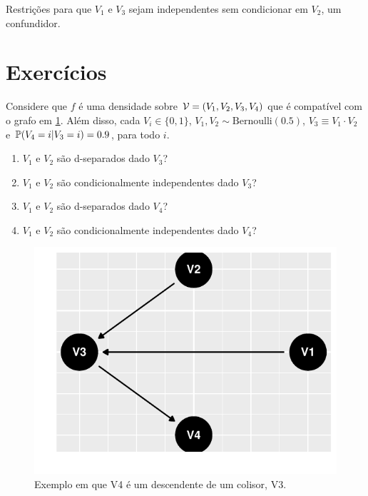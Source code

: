\begin{example}
 Restrições para que $V_1$ e $V_3$ sejam
 independentes sem condicionar em $V_2$, 
 um confundidor.
\end{example}

\section{Exercícios}

\begin{exercise}
 Considere que $f$ é uma densidade sobre 
 $\sV = (V_1, V_2, V_3, V_4)$ que é compatível com
 o grafo em \cref{fig:colisor-desc}.
 Além disso, cada $V_i \in \{0,1\}$,
 $V_1, V_2 \sim \text{Bernoulli}(0.5)$,
 $V_3 \equiv V_1 \cdot V_2$ e
 $\P(V_4 = i | V_3 = i) = 0.9$, para todo $i$.
 \begin{enumerate}[label=(\alph*)]
  \item $V_1$ e $V_2$ são d-separados dado $V_3$?
  \item $V_1$ e $V_2$ são condicionalmente independentes dado $V_3$?
  \item $V_1$ e $V_2$ são d-separados dado $V_4$?
  \item $V_1$ e $V_2$ são condicionalmente independentes dado $V_4$?
 \end{enumerate}
 
\begin{knitrout}
\color{fgcolor}\begin{figure}[t]

{\centering \includegraphics[width=\maxwidth]{./figures/colisor-desc-1} 

}

\caption[Exemplo em que V4 é um descendente de um colisor, V3]{Exemplo em que V4 é um descendente de um colisor, V3.}\label{fig:colisor-desc}
\end{figure}

\end{knitrout}
\end{exercise}

